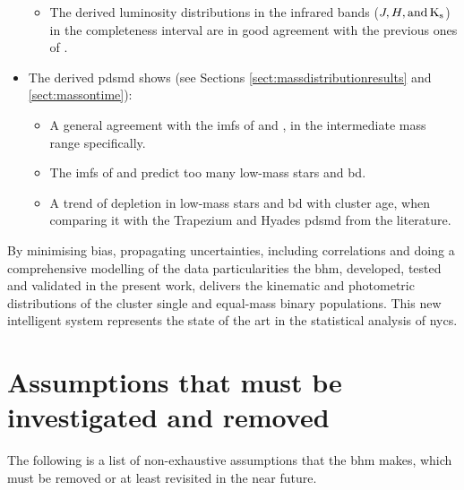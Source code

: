 \begin{itemize}
\begin{itemize}
\item The derived luminosity distributions in the infrared bands ($J,H, \rm{and} \,K_s$) in the completeness interval are in good agreement with the previous ones of \citet{Bouy2015}.
\end{itemize}
\item The derived \acrfull{pdsmd} \cite[using an age of 120 \gls{myr} and the BT-Settl isochrone model of][]{Allard2012} shows (see Sections \ref{sect:massdistributionresults} and \ref{sect:massontime}):
\begin{itemize}
\item A general agreement with the \glspl{imf} of \citet{Chabrier2005} and \citet{Thies2007}, in the intermediate mass range specifically.
\item The \glspl{imf} of \citet{Chabrier2005} and \citet{Thies2007} predict too many low-mass stars and \acrfull{bd}.
\item A trend of depletion in low-mass stars and \gls{bd} with cluster age, when comparing it with the Trapezium and Hyades \gls{pdsmd} from the literature.
\end{itemize}
\end{itemize}

By minimising bias, propagating uncertainties, including correlations and doing a comprehensive modelling of the data particularities the \gls{bhm}, developed, tested and validated in the present work, delivers the kinematic and photometric distributions of the cluster single and equal-mass binary populations. This new intelligent system represents the state of the art in the statistical analysis of \glspl{nyc}.

\section{Assumptions that must be investigated and removed}

The following is a list of non-exhaustive assumptions that the \gls{bhm} makes, which must be removed or at least revisited in the near future.


